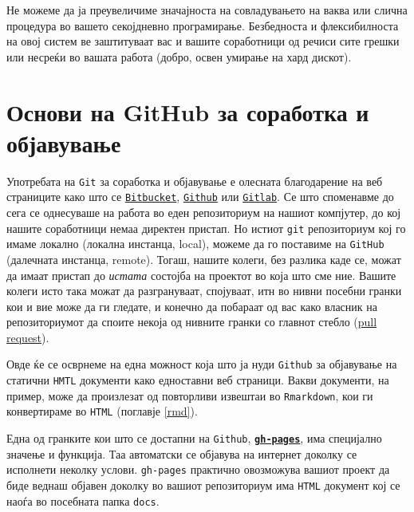 \documentclass[
]{book}
\begin{document}
Не можеме да ја преувеличиме значајноста на совладувањето на ваква или слична процедура во вашето секојдневно програмирање. Безбедноста и флексибилноста на овој систем ве заштитуваат вас и вашите соработници од речиси сите грешки или несреќи во вашата работа (добро, освен умирање на хард дискот).

\hypertarget{ux43eux441ux43dux43eux432ux438-ux43dux430-github-ux437ux430-ux441ux43eux440ux430ux431ux43eux442ux43aux430-ux438-ux43eux431ux458ux430ux432ux443ux432ux430ux45aux435}{%
\section{Основи на GitHub за соработка и објавување}\label{ux43eux441ux43dux43eux432ux438-ux43dux430-github-ux437ux430-ux441ux43eux440ux430ux431ux43eux442ux43aux430-ux438-ux43eux431ux458ux430ux432ux443ux432ux430ux45aux435}}

Употребата на \texttt{Git} за соработка и објавување е олесната благодарение на веб страниците како што се \href{https://bitbucket.org/product/}{\texttt{Bitbucket}}, \href{https://github.com/}{\texttt{Github}} или \href{https://about.gitlab.com/}{\texttt{Gitlab}}. Се што споменавме до сега се однесуваше на работа во еден репозиториум на нашиот компјутер, до кој нашите соработници немаа директен пристап. Но истиот \texttt{git} репозиториум кој го имаме локално (локална инстанца, local), можеме да го поставиме на \texttt{GitHub} (далечната инстанца, remote). Тогаш, нашите колеги, без разлика каде се, можат да имаат пристап до \emph{истата} состојба на проектот во која што сме ние. Вашите колеги исто така можат да разгрануваат, спојуваат, итн во нивни посебни гранки кои и вие може да ги гледате, и конечно да побараат од вас како власник на репозиториумот да споите некоја од нивните гранки со главнот стебло (\href{https://docs.github.com/en/free-pro-team@latest/github/collaborating-with-issues-and-pull-requests/about-pull-requests}{pull request}).

Овде ќе се осврнеме на една можност која што ја нуди \texttt{Github} за објавување на статични \texttt{HMTL} документи како едноставни веб страници. Вакви документи, на пример, може да произлезат од повторливи извештаи во \texttt{Rmarkdown}, кои ги конвертираме во \texttt{HTML} (поглавје \ref{rmd}).

Една од гранките кои што се достапни на \texttt{Github}, \href{https://pages.github.com/}{\textbf{\texttt{gh-pages}}}, има специјално значење и функција. Таа автоматски се објавува на интернет доколку се исполнети неколку услови. \texttt{gh-pages} практично овозможува вашиот проект да биде веднаш објавен доколку во вашиот репозиториум има \texttt{HTML} документ кој се наоѓа во посебната папка \texttt{docs}.
\end{document}
